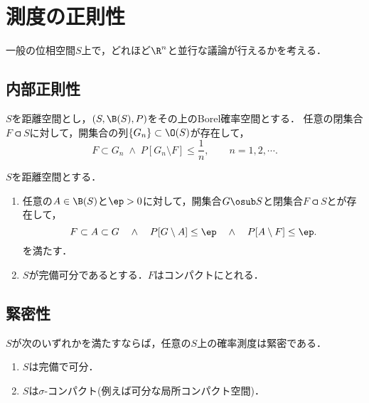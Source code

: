 \documentclass[uplatex,dvipdfmx]{jsreport}
\begin{document}
\section{測度の正則性}

\begin{tcolorbox}[colframe=ForestGreen, colback=ForestGreen!10!white,breakable,colbacktitle=ForestGreen!40!white,coltitle=black,fonttitle=\bfseries\sffamily,
title=]
    一般の位相空間$S$上で，どれほど$\R^n$と並行な議論が行えるかを考える．
\end{tcolorbox}

\subsection{内部正則性}

\begin{lemma}
    $S$を距離空間とし，$(S,\B(S),P)$をその上のBorel確率空間とする．
    任意の閉集合$F\csub S$に対して，開集合の列$\{G_n\}\subset\O(S)$が存在して，
    \[F\subset G_n\;\land\;P[G_n\setminus F]\le\frac{1}{n},\qquad n=1,2,\cdots.\]
\end{lemma}

\begin{theorem}[距離空間上の確率測度の正則性]
    $S$を距離空間とする．
    \begin{enumerate}
        \item 任意の$A\in\B(S)$と$\ep>0$に対して，開集合$G\osub S$と閉集合$F\csub S$とが存在して，
        \[F\subset A\subset G\quad\land\quad P[G\setminus A]\le\ep\quad\land\quad P[A\setminus F]\le\ep.\]
        を満たす．
        \item $S$が完備可分であるとする．$F$はコンパクトにとれる．
    \end{enumerate}
\end{theorem}

\subsection{緊密性}

\begin{theorem}[緊密性の十分条件]
    $S$が次のいずれかを満たすならば，任意の$S$上の確率測度は緊密である．
    \begin{enumerate}
        \item $S$は完備で可分．
        \item $S$は$\sigma$-コンパクト(例えば可分な局所コンパクト空間)．
    \end{enumerate}
\end{theorem}
\end{document}
